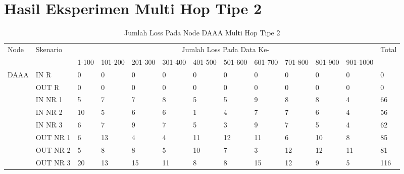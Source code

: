 \chapter{Hasil Eksperimen Multi Hop Tipe 2}
\label{lamp:D}

\begin{table}[H]
  \centering
  \caption{Jumlah Loss Pada Node DAAA Multi Hop Tipe 2}
    \begin{tabular}{|p{1cm}|p{1.9cm}|p{0.6cm}|p{0.6cm}|p{0.6cm}|p{0.6cm}|p{0.6cm}|p{0.6cm}|p{0.6cm}|p{0.6cm}|p{0.6cm}|p{0.6cm}|p{1cm}|}
    \hline
        \multirow{2}{*}{Node}&\multirow{2}{*}{Skenario}&\multicolumn{10}{|c|}{Jumlah Loss Pada Data Ke-}&\multirow{2}{*}{Total} \\\cline{3-12}
          & & 1-100 & 101-200 & 201-300 & 301-400 & 401-500 & 501-600 & 601-700 & 701-800 & 801-900 & 901-1000 & \\
        \hline
    \multirow{8}{*}{DAAA}  
    & IN R  & 0     & 0     & 0     & 0     & 0     & 0     & 0     & 0     & 0     & 0     & 0 \\
    & OUT R & 0     & 0     & 0     & 0     & 0     & 0     & 0     & 0     & 0     & 0     & 0 \\
          & IN NR 1 & 5     & 7     & 7     & 8     & 5     & 5     & 9     & 8     & 8     & 4     & 66 \\
          & IN NR 2 & 10    & 5     & 6     & 6     & 1     & 4     & 7     & 7     & 6     & 4     & 56 \\
          & IN NR 3 & 6     & 7     & 9     & 7     & 5     & 3     & 9     & 7     & 5     & 4     & 62 \\
          & OUT NR 1 & 6     & 13    & 4     & 4     & 11    & 12    & 11    & 6     & 10    & 8     & 85 \\
          & OUT NR 2 & 5     & 8     & 8     & 5     & 10    & 7     & 3     & 12    & 12    & 11    & 81 \\
          & OUT NR 3 & 20    & 13    & 15    & 11    & 8     & 8     & 15    & 12    & 9     & 5     & 116 \\
    
    \hline
    \end{tabular}%
  \label{tab:addlabel}%
\end{table}%

